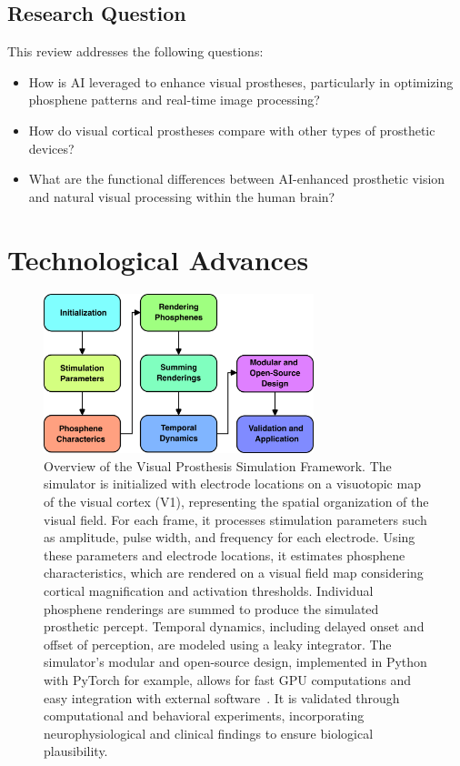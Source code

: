 \documentclass[twocolumn,10pt]{article}
\begin{document}
\subsection{Research Question}
This review addresses the following questions:
\begin{itemize}
      \item How is AI leveraged to enhance visual prostheses, particularly in
            optimizing phosphene patterns and real-time image
            processing?
      \item How do visual cortical prostheses compare with other types of
            prosthetic devices?
      \item What are the functional differences between AI-enhanced prosthetic
            vision and natural visual processing within the human brain?
\end{itemize}

\section{Technological Advances}\label{sec:tech_advances}
\begin{figure}[hbt!]
      \centering
      \includegraphics[width=0.7\textwidth]{imgs/block_diagram_vis_prost.png}
      \caption{Overview of the Visual Prosthesis Simulation Framework. The
            simulator is initialized with electrode locations on a visuotopic
            map of the visual cortex (V1), representing the spatial organization
            of the visual field. For each frame, it processes stimulation
            parameters such as amplitude, pulse width, and frequency for each
            electrode. Using these parameters and electrode locations, it
            estimates phosphene characteristics, which are rendered on a visual
            field map considering cortical magnification and activation
            thresholds. Individual phosphene renderings are summed to produce
            the simulated prosthetic percept. Temporal dynamics, including
            delayed onset and offset of perception, are modeled using a leaky
            integrator. The simulator's modular and open-source design,
            implemented in Python with PyTorch for example, allows for fast GPU
            computations and easy integration with external
            software~\cite{deruytervansteveninckEndtoendOptimizationProsthetic2022}.
            It is validated through computational and behavioral experiments,
            incorporating neurophysiological and clinical findings to ensure
            biological plausibility.}\label{fig:simulator_framework}
\end{figure}
\end{document}
